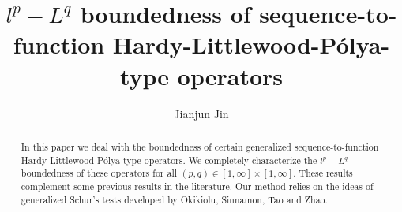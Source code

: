 \documentclass[10pt]{amsart}
\theoremstyle{definition}    %
\numberwithin{equation}{section}
\begin{document}
\begin{center}
\title[Hardy-Littlewood-P\'{o}lya-type operators]{$l^{p}-L^{q}$ boundedness of sequence-to-function Hardy-Littlewood-P\'{o}lya-type operators}
\end{center}

\author{Jianjun Jin }
\address{School of Mathematics Sciences, Hefei University of Technology, Xuancheng Campus, Xuancheng 242000, P.R.China}




\begin{abstract} 
In this paper we deal with the boundedness of certain generalized sequence-to-function Hardy-Littlewood-P\'{o}lya-type operators. We completely characterize the $l^{p}-L^{q}$ boundedness of these operators for all $(p, q)\in [1, \infty]\times[1, \infty]$. These results complement some previous results in the literature. Our method relies on the ideas of generalized Schur’s tests developed by Okikiolu, Sinnamon, Tao and Zhao.  
\end{abstract} 
\maketitle
\end{document}
